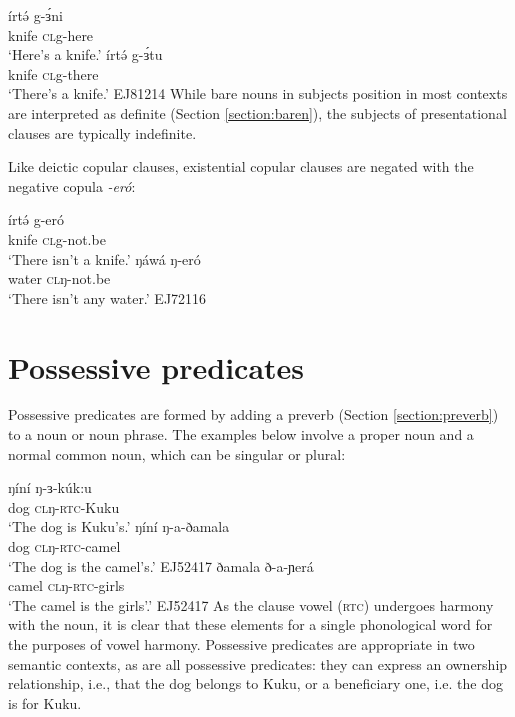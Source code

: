 \ea 
	\ea \gll	írtə́	g-ɜ́ni\\
				knife 	\textsc{cl}g-here\\
		\glt 	‘Here’s a knife.’ 		
	\ex \gll 	írtə́	g-ɜ́tu\\
				knife 	\textsc{cl}g-there\\
		\glt 	‘There’s a knife.’	\hfill EJ81214	
\z \z 
While bare nouns in subjects position in most contexts are interpreted as definite (Section \ref{section:baren}), the subjects of presentational clauses are typically indefinite. 


 
Like deictic copular clauses, existential copular clauses are negated with the negative copula \textit{-eró}:

\ea	
	\ea \gll	írtə́	g-eró\\
				knife 	\textsc{cl}g-not.be\\
		\glt 	‘There isn't a knife.’
	\ex \gll 	ŋáwá ŋ-eró\\
				water \textsc{cl}ŋ-not.be\\
		\glt	`There isn't any water.' \hfill EJ72116
\z \z 

\section{Possessive predicates}\label{section:posspred}

Possessive predicates are formed by adding a preverb (Section \ref{section:preverb}) to a noun or noun phrase. The examples below involve a proper noun and a normal common noun, which can be singular or plural:

\ea 
\ea \gll  	ŋíní ŋ-ɜ-kúk:u\\
			dog \textsc{cl}ŋ-\textsc{rtc}-Kuku\\
	\glt 	`The dog is Kuku's.'
\ex	\gll	ŋíní ŋ-a-ðamala\\
			dog \textsc{cl}ŋ-\textsc{rtc}-camel\\
	\glt	`The dog is the camel's.' \hfill EJ52417
\ex	\gll	ðamala ð-a-ɲerá\\
			camel \textsc{cl}ŋ-\textsc{rtc}-girls\\
	\glt	`The camel is the girls'.' \hfill EJ52417
	\z 
\z 
As the clause vowel (\textsc{rtc}) undergoes harmony with the noun, it is clear that these elements for a single phonological word for the purposes of vowel harmony. Possessive predicates are appropriate in two semantic contexts, as are all possessive predicates: they can express an ownership relationship, i.e., that the dog belongs to Kuku, or a beneficiary one, i.e. the dog is for Kuku.

